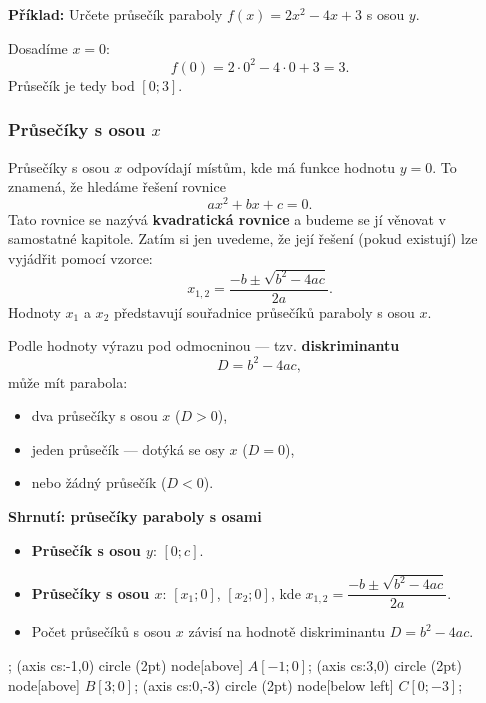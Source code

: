 \documentclass[12pt,a4paper]{article}
\begin{document}
\begin{examplebox}
\textbf{Příklad:}  
Určete průsečík paraboly \(f(x) = 2x^2 - 4x + 3\) s osou \(y\).

Dosadíme \(x = 0\):
\[
f(0) = 2 \cdot 0^2 - 4 \cdot 0 + 3 = 3.
\]
Průsečík je tedy bod \([0; 3]\).
\end{examplebox}

\subsubsection*{Průsečíky s osou \(x\)}

Průsečíky s osou \(x\) odpovídají místům, kde má funkce hodnotu \(y = 0\).  
To znamená, že hledáme řešení rovnice
\[
ax^2 + bx + c = 0.
\]
Tato rovnice se nazývá \textbf{kvadratická rovnice} a budeme se jí věnovat v samostatné kapitole.  
Zatím si jen uvedeme, že její řešení (pokud existují) lze vyjádřit pomocí vzorce:
\[
x_{1,2} = \frac{-b \pm \sqrt{b^2 - 4ac}}{2a}.
\]
Hodnoty \(x_1\) a \(x_2\) představují souřadnice průsečíků paraboly s osou \(x\).

\medskip
Podle hodnoty výrazu pod odmocninou — tzv. \textbf{diskriminantu}
\[
D = b^2 - 4ac,
\]
může mít parabola:
\begin{itemize}
  \item dva průsečíky s osou \(x\) (\(D > 0\)),
  \item jeden průsečík — dotýká se osy \(x\) (\(D = 0\)),
  \item nebo žádný průsečík (\(D < 0\)).
\end{itemize}

\begin{definitionbox}
\textbf{Shrnutí: průsečíky paraboly s osami}
\begin{itemize}
  \item \textbf{Průsečík s osou \(y\)}: \([0; c]\).
  \item \textbf{Průsečíky s osou \(x\)}: \([x_1; 0]\), \([x_2; 0]\),  
  kde \(x_{1,2} = \dfrac{-b \pm \sqrt{b^2 - 4ac}}{2a}\).
  \item Počet průsečíků s osou \(x\) závisí na hodnotě diskriminantu \(D = b^2 - 4ac\).
\end{itemize}
\end{definitionbox}

\begin{center}
\begin{axisgraph}[
  xmin=-3, xmax=5,
  ymin=-5, ymax=5,
  samples=200,
  width=10cm,
  height=10cm,
  title={Graf funkce $y = x^2 - 2x - 3$}
]
  ;
   (axis cs:-1,0) circle (2pt) node[above] {$A[-1;0]$};
   (axis cs:3,0) circle (2pt) node[above] {$B[3;0]$};
   (axis cs:0,-3) circle (2pt) node[below left] {$C[0;-3]$};

\end{axisgraph}
\end{center}
\end{document}
